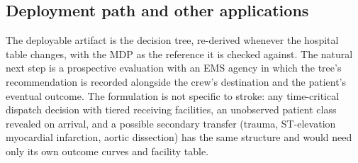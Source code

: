 \subsection{Deployment path and other applications}
The deployable artifact is the decision tree, re-derived whenever the hospital table changes, with the MDP as the reference it is checked against. The natural next step is a prospective evaluation with an EMS agency in which the tree's recommendation is recorded alongside the crew's destination and the patient's eventual outcome. The formulation is not specific to stroke: any time-critical dispatch decision with tiered receiving facilities, an unobserved patient class revealed on arrival, and a possible secondary transfer (trauma, ST-elevation myocardial infarction, aortic dissection) has the same structure and would need only its own outcome curves and facility table.
